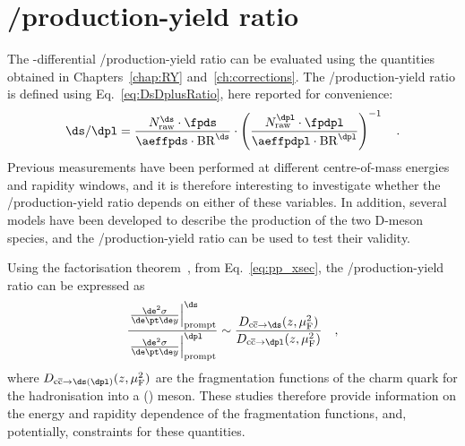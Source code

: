 \chapter{\texorpdfstring{\ds/\dpl production-yield ratio}{Ds+/D+ production-yield ratio}}\label{ch:results}
The \pt-differential \ds/\dpl production-yield ratio can be evaluated using the quantities obtained in Chapters~\ref{chap:RY} and~\ref{ch:corrections}. The \ds/\dpl production-yield ratio is defined using Eq.~\ref{eq:DsDplusRatio}, here reported for convenience:
\begin{equation*}
    \ds/\dpl = \frac{N_\mathrm{raw}^{\ds}\cdot \fpds}{\aeffpds \cdot \mathrm{BR}^\ds} \cdot \left(\frac{N_\mathrm{raw}^{\dpl}\cdot \fpdpl}{\aeffpdpl \cdot \mathrm{BR}^\dpl}\right)^{-1}\quad .
\end{equation*}
Previous measurements have been performed at different centre-of-mass energies and rapidity windows, and it is therefore interesting to investigate whether the \ds/\dpl production-yield ratio depends on either of these variables. In addition, several models have been developed to describe the production of the two D-meson species, and the \ds/\dpl production-yield ratio can be used to test their validity. 

Using the factorisation theorem~\cite{Collins:1989gx}, from Eq.~\ref{eq:pp_xsec}, the \ds/\dpl production-yield ratio can be expressed as
\begin{equation*}
    \frac{\left.\frac{\de^2\sigma}{\de\pt\de y}\right\vert^\ds_\mathrm{prompt}}{\left.\frac{\de^2\sigma}{\de\pt\de y}\right\vert^\dpl_\mathrm{prompt}} \sim \frac{D_\mathrm{c\overline{c}\rightarrow \ds}(z,\mu_\mathrm{F}^2)}{D_\mathrm{c\overline{c}\rightarrow \dpl}(z,\mu_\mathrm{F}^2)}\quad ,
\end{equation*}
where $D_\mathrm{c\overline{c}\rightarrow \ds (\dpl)}(z,\mu_\mathrm{F}^2)$ are the fragmentation functions of the charm quark for the hadronisation into a \ds (\dpl) meson. These studies therefore provide information on the energy and rapidity dependence of the fragmentation functions, and, potentially, constraints for these quantities. 


